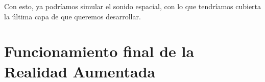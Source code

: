 \documentclass{subfiles}
\begin{document}
        Con esto, ya podríamos simular el sonido espacial, con lo que tendríamos cubierta la última capa de \ra que queremos desarrollar.

        \section{Funcionamiento final de la Realidad Aumentada}
        \label{sec:3.5}

        
\end{document}
